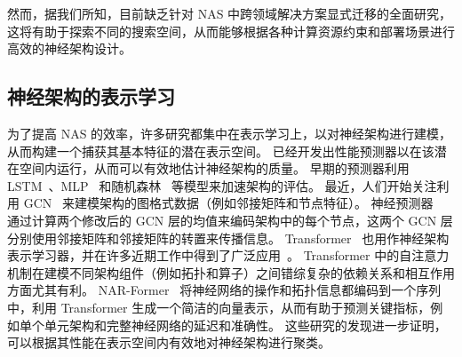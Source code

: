 \documentclass[../main_zh.tex]{subfiles}
\begin{document}
然而，据我们所知，目前缺乏针对 NAS 中跨领域解决方案显式迁移的全面研究，这将有助于探索不同的搜索空间，从而能够根据各种计算资源约束和部署场景进行高效的神经架构设计。 

\subsection{神经架构的表示学习}

为了提高 NAS 的效率，许多研究都集中在表示学习上，以对神经架构进行建模，从而构建一个捕获其基本特征的潜在表示空间。
已经开发出性能预测器以在该潜在空间内运行，从而可以有效地估计神经架构的质量。 
早期的预测器利用 LSTM~\cite{DBLP:journals/corr/abs-1712-03351,DBLP:conf/eccv/LiuZNSHLFYHM18,DBLP:conf/nips/LuoTQCL18}、MLP~\cite{DBLP:conf/cvpr/Xu00TJX021,DBLP:conf/aaai/WhiteNS21} 和随机森林~\cite{DBLP:journals/tec/SunWXJYZ20} 等模型来加速架构的评估。
最近，人们开始关注利用 GCN~\cite{DBLP:conf/cvpr/ChenGCLZWT21,DBLP:conf/aaai/LiGZ20,DBLP:conf/nips/ShiPXLKZ20,DBLP:conf/eccv/WenLCLBK20,DBLP:conf/ijcnn/LukasikFZHK21} 来建模架构的图格式数据（例如邻接矩阵和节点特征）。
神经预测器~\cite{DBLP:conf/eccv/WenLCLBK20} 通过计算两个修改后的 GCN 层的均值来编码架构中的每个节点，这两个 GCN 层分别使用邻接矩阵和邻接矩阵的转置来传播信息。
Transformer~\cite{DBLP:conf/nips/VaswaniSPUJGKP17} 也用作神经架构表示学习器，并在许多近期工作中得到了广泛应用~\cite{DBLP:conf/mm/Guo0HLXY022,DBLP:conf/cvpr/YiZH0023}。
Transformer 中的自注意力机制在建模不同架构组件（例如拓扑和算子）之间错综复杂的依赖关系和相互作用方面尤其有利。
NAR-Former~\cite{DBLP:conf/cvpr/YiZH0023} 将神经网络的操作和拓扑信息都编码到一个序列中，利用 Transformer 生成一个简洁的向量表示，从而有助于预测关键指标，例如单个单元架构和完整神经网络的延迟和准确性。
这些研究的发现进一步证明，可以根据其性能在表示空间内有效地对神经架构进行聚类。
\end{document}
